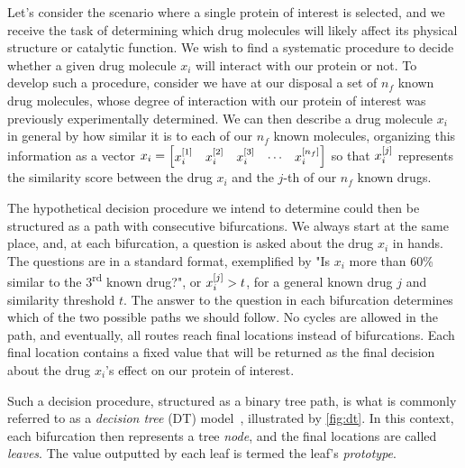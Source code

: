 Let's consider the scenario where a single protein of interest is selected, and we receive the task of determining which drug molecules will likely affect its physical structure or catalytic function.
We wish to find a systematic procedure to decide whether a given drug molecule $x_i$ will interact with our protein or not. To develop such a procedure, consider we have at our disposal a set of $n_f$ known drug molecules, whose degree of interaction with our protein of interest was previously experimentally determined. We can then describe a drug molecule $x_i$ in general by how similar it is to each of our $n_f$ known molecules, organizing this information as a vector $x_i = \begin{bmatrix}x_i^{[1]} & x_i^{[2]} & x_i^{[3]} & \cdots & x_i^{[n_f]}\end{bmatrix}$ so that $x_i^{[j]}$ represents the similarity score between the drug $x_i$ and the $j$-th of our $n_f$ known drugs.

The hypothetical decision procedure we intend to determine could then be structured as a path with consecutive bifurcations. We always start at the same place, and, at each bifurcation, a question is asked about the drug $x_i$ in hands. The questions are in a standard format, exemplified by "Is $x_i$ more than 60\% similar to the 3\textsuperscript{rd} known drug?", or $x_i^{[j]} > t$, for a general known drug $j$ and similarity threshold $t$. The answer to the question in each bifurcation determines which of the two possible paths we should follow. No cycles are allowed in the path, and eventually, all routes reach final locations instead of bifurcations. Each final location contains a fixed value that will be returned as the final decision about the drug $x_i$'s effect on our protein of interest.

Such a decision procedure, structured as a binary tree path, is what is commonly referred to as a \emph{decision tree} (DT) model~\cite{breiman1984classification}, illustrated by \autoref{fig:dt}. 
In this context, each bifurcation then represents a tree \emph{node}, and the final locations are called \emph{leaves}. The value outputted by each leaf is termed the leaf's \emph{prototype}.
%

